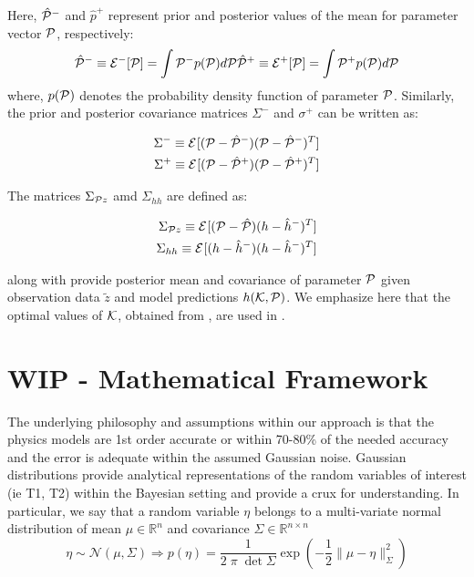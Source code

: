 \documentclass{article}         %
\theoremstyle{definition}
\theoremstyle{remark}
\begin{document}
Here, $\hat{\mathcal{P}}^-$ and $\hat{p}^+$ represent prior and posterior values of the mean for parameter vector $\mathcal{P}$, respectively:
\begin{eqnarray}
\hat{\mathcal{P}}^-\equiv \mathcal{E}^{-}[\mathcal{P}]=\int \mathcal{P}^- p(\mathcal{P})d\mathcal{P} \label{Pprior}
\hat{\mathcal{P}}^+\equiv \mathcal{E}^{+}[\mathcal{P}]=\int \mathcal{P}^+ p(\mathcal{P})d\mathcal{P} \label{Pposterior}
\end{eqnarray}
where, $p(\mathcal{P})$ denotes the probability density function of parameter $\mathcal{P}$. Similarly, the prior and posterior covariance matrices $\Sigma^{-}$ and $\sigma^+$ can be written as:

\begin{eqnarray}
\Sigma^-\equiv\mathcal{E}^{}[(\mathcal{P}-\hat{\mathcal{P}}^-)(\mathcal{P}-\hat{\mathcal{P}}^-)^T]\\
\Sigma^+\equiv\mathcal{E}^{}[(\mathcal{P}-\hat{\mathcal{P}}^+)(\mathcal{P}-\hat{\mathcal{P}}^+)^T]
\end{eqnarray}

The matrices $\Sigma_{\mathcal{P} z}$ amd $\Sigma_{hh}$ are defined as:

\begin{eqnarray}
\Sigma_{\mathcal{P} z} \equiv\mathcal{E}^{}[(\mathcal{P}-\hat{\mathcal{P}})(h-\hat{h}^-)^T]\\
\Sigma_{hh} \equiv\mathcal{E}^{}[(h-\hat{h}^-)(h-\hat{h}^-)^T]
\end{eqnarray}

 along with  provide posterior mean and covariance of parameter $\mathcal{P}$ given observation data $\tilde{z}$ and model predictions $h(\mathcal{K},\mathcal{P})$.
We emphasize here that the optimal values of $\mathcal{K}$, obtained from , are used in .

 

\section{ WIP - Mathematical Framework}\label{GeneralMathFramework}

The underlying philosophy and assumptions within our approach is that the physics 
models are 1st order accurate or within 70-80\% of the needed accuracy and the error is
adequate within the assumed Gaussian noise.
Gaussian distributions provide analytical representations of the random
variables of interest (ie T1, T2) within the Bayesian setting and 
provide a crux for understanding. In particular, we say that a random
variable $\eta$ belongs to a multi-variate normal distribution 
of mean $\mu \in \mathbb{R}^n $ and covariance $\Sigma \in \mathbb{R}^{n \times n}$
\[
     \eta \sim \mathcal{N}(\mu,\Sigma)  
    \Rightarrow
      p(\eta)  = \frac{1}{2 \; \pi \; \det{\Sigma}} \exp\left( - \frac{1}{2} \| \mu - \eta\|^2_{\Sigma}\right)
\]
\end{document}
